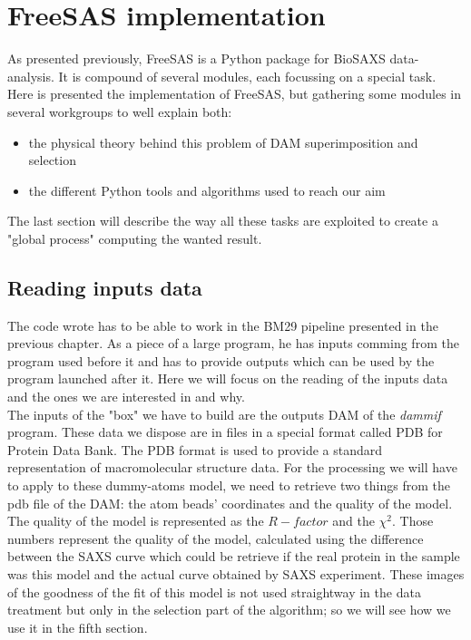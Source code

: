 \documentclass[a4paper, 11pt]{report}
\begin{document}
\chapter{FreeSAS implementation}

As presented previously, FreeSAS is a Python package for BioSAXS data-
analysis. 
It is compound of several modules, each focussing on a special task. 
Here is presented the implementation of FreeSAS, but gathering some 
modules in several workgroups to well explain both:
\begin{itemize}
 \item the physical theory behind this problem of DAM superimposition 
and selection
 \item the different Python tools and algorithms used to reach our aim
\end{itemize}

The last section will describe the way all these tasks are exploited 
to create a "global process" computing the wanted result. 

\section{Reading inputs data}

The code wrote has to be able to work in the BM29 pipeline presented 
in the previous chapter. 
As a piece of a large program, he has inputs comming from the program 
used before it and has to provide outputs which can be used by the 
program launched after it. 
Here we will focus on the reading of the inputs data and the ones we  
are interested in and why.\\

The inputs of the "box" we have to build are the outputs DAM of the 
\textit{dammif} program. 
These data we dispose are in files in a special format called PDB for 
Protein Data Bank. %
The PDB format is used to provide a standard representation of 
macromolecular structure data. 
For the processing we will have to apply to these dummy-atoms model, 
we need to retrieve two things from the pdb file of the DAM: the atom 
beads' coordinates and the quality of the model.\\

The quality of the model is represented as the $R-factor$ and the 
$\chi^2$. 
Those numbers represent the quality of the model, calculated using the 
difference between the SAXS curve which could be retrieve if the real 
protein in the sample was this model and the actual curve obtained by 
SAXS experiment. 
These images of the goodness of the fit of this model is not used 
straightway in the data treatment but only in the selection part of 
the algorithm; so we will see how we use it in the fifth section.\\
\end{document}
